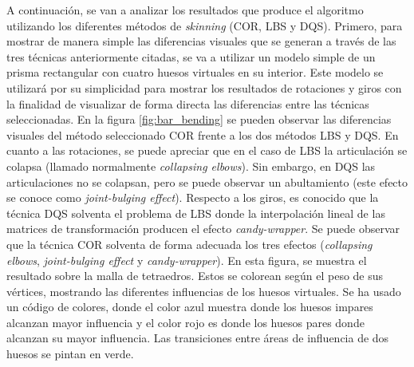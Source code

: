 




A continuación, se van a analizar los resultados que produce el algoritmo utilizando los diferentes métodos de \emph{skinning} (\ac{COR}, \ac{LBS} y \ac{DQS}).
%
Primero, para mostrar de manera simple las diferencias visuales que se generan a través de las tres técnicas anteriormente citadas, se va a utilizar un modelo simple de un prisma rectangular con cuatro huesos virtuales en su interior. Este modelo  se utilizará por su simplicidad para mostrar los resultados de rotaciones y giros con la finalidad de visualizar de forma directa las diferencias entre las técnicas seleccionadas. En la figura \ref{fig:bar_bending} se pueden observar las diferencias visuales del método seleccionado \ac{COR} frente a los dos métodos \ac{LBS} y \ac{DQS}. En cuanto a las rotaciones, se puede apreciar que en el caso de \ac{LBS} la articulación se colapsa (llamado normalmente \emph{collapsing elbows}). Sin embargo, en \ac{DQS} las articulaciones no se colapsan, pero se puede observar un abultamiento (este efecto se conoce como \emph{joint-bulging effect}). Respecto a los giros, es conocido que la técnica \ac{DQS} solventa el problema de \ac{LBS} donde la interpolación lineal de las matrices de transformación producen el efecto \emph{candy-wrapper}. Se puede observar que la técnica \ac{COR} solventa de forma adecuada los tres efectos (\emph{collapsing elbows}, \emph{joint-bulging effect} y \emph{candy-wrapper}). 
En esta figura, se muestra el resultado sobre la malla de tetraedros. Estos se colorean según el peso de sus vértices, mostrando las diferentes influencias de los huesos virtuales. Se ha usado un código de colores, donde el color azul muestra donde los huesos impares alcanzan mayor influencia y el color rojo es donde los huesos pares donde alcanzan su mayor influencia. %
Las transiciones entre áreas de influencia de dos huesos se pintan en verde.

